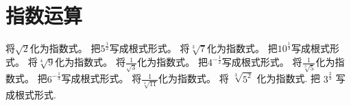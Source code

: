 
\section{指数运算}

\begin{Exercise}[title={基础根式与指数式互换练习}, label={ex:basic - radical - exponential} ,difficulty = 1]
    \Question 将\(\sqrt{2}\)化为指数式。
    \Question 把\(5^{\frac{1}{2}}\)写成根式形式。
    \Question 将\(\sqrt[3]{7}\)化为指数式。
    \Question 把\(10^{\frac{1}{3}}\)写成根式形式。
    \Question 将\(\sqrt[4]{9}\)化为指数式。
    \Question 将\(\frac{1}{\sqrt{3}}\)化为指数式。
    \Question 把\(4^{-\frac{1}{2}}\)写成根式形式。
    \Question 将\(\frac{1}{\sqrt[3]{5}}\)化为指数式。
    \Question 把\(6^{-\frac{1}{3}}\)写成根式形式。
    \Question 将\(\frac{1}{\sqrt[4]{11}}\)化为指数式。
    \Question 将 $\sqrt[3]{5^2}$ 化为指数式.
    \Question 把 $3^{\frac{2}{3}}$ 写成根式形式.
\end{Exercise}
